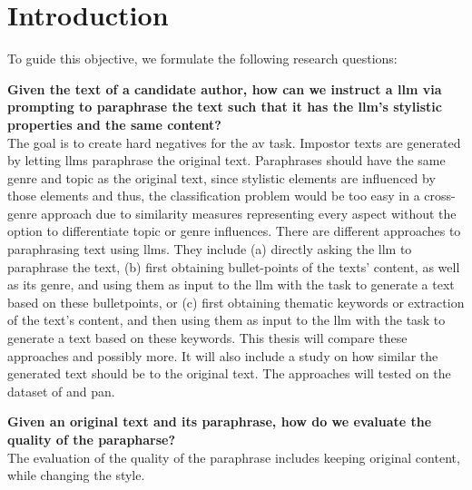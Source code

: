 \chapter{Introduction}
\label{chap:introduction}





To guide this objective, we formulate the following research questions:
\begin{questions}
    \item \textbf{Given the text of a candidate author, how can we instruct a \ac{llm} via prompting to paraphrase the text such that it has the \ac{llm}'s stylistic properties and the same content?} \label{enum:rq1} \hfill \\
    The goal is to create hard negatives for the \ac{av} task.
    Impostor texts are generated by letting \acp{llm} paraphrase the original text.
    Paraphrases should have the same genre and topic as the original text, 
    since stylistic elements are influenced by those elements and thus, 
    the classification problem would be too easy in a cross-genre approach 
    due to similarity measures representing every aspect without the option to differentiate topic or genre influences.
    There are different approaches to paraphrasing text using \acp{llm}.
    They include (a) directly asking the \ac{llm} to paraphrase the text, 
    (b) first obtaining bullet-points of the texts' content, as well as its genre, and using them as input to the \ac{llm} with the task to generate a text based on these bulletpoints, 
    or (c) first obtaining thematic keywords or extraction of the text's content, and then using them as input to the \ac{llm} with the task to generate a text based on these keywords.
    This thesis will compare these approaches and possibly more.
    It will also include a study on how similar the generated text should be to the original text.
    The approaches will tested on the dataset of \citet{koppel_determining_2014} and \ac{pan}.

    \item \textbf{Given an original text and its paraphrase, how do we evaluate the quality of the parapharse?} \label{enum:rq2} \hfill \\
    The evaluation of the quality of the paraphrase includes keeping original content, while changing the style.


\end{questions}
